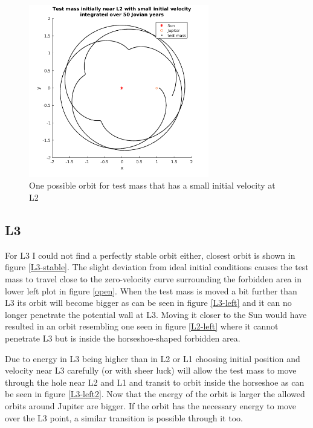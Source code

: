 \documentclass[12pt,a4paper,titlepage]{article}
\begin{document}
\begin{figure}
\centering
\includegraphics[width=0.7\textwidth]{../plots/L2-right.png}
\caption{One possible orbit for test mass that has a small initial velocity at L2}
\label{L2-morevel}
\end{figure}

\subsection{L3}
For L3 I could not find a perfectly stable orbit either, closest orbit is shown in figure \ref{L3-stable}. The slight deviation from ideal initial conditions causes the test mass to travel close to the zero-velocity curve surrounding the forbidden area in lower left plot in figure \ref{open}. When the test mass is moved a bit further than L3 its orbit will become bigger as can be seen in figure \ref{L3-left} and it can no longer penetrate the potential wall at L3. Moving it closer to the Sun would have resulted in an orbit resembling one seen in figure \ref{L2-left} where it cannot penetrate L3 but is inside the horseshoe-shaped forbidden area.

Due to energy in L3 being higher than in L2 or L1 choosing initial position and velocity near L3 carefully (or with sheer luck) will allow the test mass to move through the hole near L2 and L1 and transit to orbit inside the horseshoe as can be seen in figure \ref{L3-left2}. Now that the energy of the orbit is larger the allowed orbits around Jupiter are bigger. If the orbit has the necessary energy to move over the L3 point, a similar transition is possible through it too.
\end{document}
